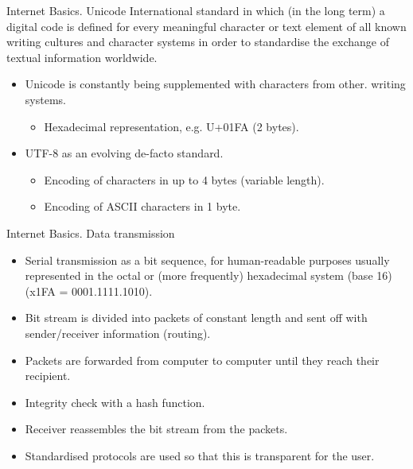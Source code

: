 \documentclass{beamer}
\begin{document}
\begin{frame}{Internet Basics. Unicode} 
International standard in which (in the long term) a digital code is defined
for every meaningful character or text element of all known writing cultures
and character systems in order to standardise the exchange of textual
information worldwide.

\begin{itemize}
\item Unicode is constantly being supplemented with characters from other.
  writing systems.
  \begin{itemize}
  \item Hexadecimal representation, e.g. U+01FA (2 bytes).
  \end{itemize}
\item UTF-8 as an evolving de-facto standard.
  \begin{itemize}
  \item Encoding of characters in up to 4 bytes (variable length).
  \item Encoding of ASCII characters in 1 byte.
  \end{itemize}
\end{itemize}
\end{frame}
\begin{frame}{Internet Basics. Data transmission}

\begin{itemize}
\item Serial transmission as a bit sequence, for human-readable purposes
  usually represented in the octal or (more frequently) hexadecimal system
  (base 16) (x1FA = 0001.1111.1010).
\item Bit stream is divided into packets of constant length and sent off with
  sender/receiver information (routing).
\item Packets are forwarded from computer to computer until they reach their
  recipient.
\item Integrity check with a hash function.
\item Receiver reassembles the bit stream from the packets.
\item Standardised protocols are used so that this is transparent for the
  user.
\end{itemize}
\end{frame}
\end{document}
